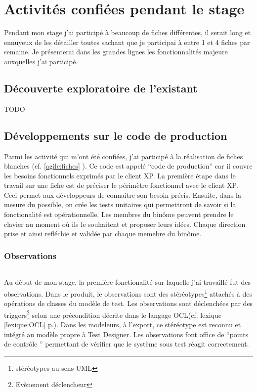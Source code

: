 \chapter{Activités confiées pendant le stage}
Pendant mon stage j'ai participé à beaucoup de fiches différentes, il serait long et ennuyeux de les détailler toutes sachant que je participai à entre 1 et 4 fiches par semaine. Je présenterai dans les grandes lignes les fonctionnalités majeure auxquelles j'ai participé.

\section{Découverte exploratoire de l'existant}
TODO

\section{Développements sur le code de production}
Parmi les activité qui m'ont été confiées, j'ai participé à la réalisation de fiches blanches (cf. \ref{agile:fiches} \pageref{agile:fiches}). Ce code est appelé ``code de production'' car il couvre les besoins fonctionnels exprimés par le client XP. La première étape dans le travail sur une fiche est de préciser le périmètre fonctionnel avec le client XP. Ceci permet aux développeurs de connaitre son besoin précis. Ensuite, dans la mesure du possible, on crée les tests unitaires qui permettront de savoir si la fonctionalité est opérationnelle. Les membres du binôme peuvent prendre le clavier au moment où ils le souhaitent et proposer leurs idées. Chaque direction prise et ainsi refléchie et validée par chaque memebre du binôme.

\subsection{Observations}

\subparagraph*{}
Au début de mon stage, la première fonctionalité sur laquelle j'ai travaillé fut des observations. Dans le produit, le observations sont des stéréotypes\footnote{stéréotypes au sens UML} attachés à des opérations de classes du modèle de test. Les observations sont déclenchées par des triggers\footnote{Evènement déclencheur} selon une précondition décrite dans le langage OCL(cf. lexique \ref{lexique:OCL} p.\pageref{lexique:OCL}). Dans les modeleurs, à l'export, ce stéréotype est reconnu et intégré au modèle propre à Test Designer. Les observations font office de ``points de contrôle '' permettant de vérifier que le système sous test réagit correctement.

